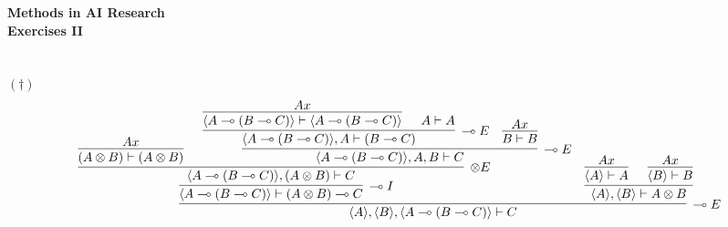 \documentclass[11pt]{article}
\newcommand{\nd}[2]{#1 \vdash #2}
\newcommand{\Zip}[1]{\langle #1 \rangle}
\newcommand{\lolli}{\multimap}
\begin{document}
\setlength{\unitlength}{1cm}

\begin{center}
{\bf Methods in AI Research} \\
\vskip5pt 
{\bf Exercises II} \\
\vskip5pt 
\end{center}

\section{}
\begin{scriptsize}
$(\dag)\qquad$ 
\[
\infer[\lolli E]{\nd{\Zip{A},\Zip{B},\Zip{A\lolli (B\lolli C)}}{C}}
{\infer[\lolli I]{\nd{\Zip{A\lolli (B\lolli C)}}{(A\otimes B)\lolli C}}
{\infer[\otimes E]{\nd{\Zip{A \lolli (B \lolli C)},(A \otimes B)}{C}}{{\infer[]{\nd{(A \otimes B)}{(A \otimes B)}}{Ax}} & 
{\infer[\lolli E]{\nd{\Zip{A \lolli (B \lolli C)},{A},{B}}{C}}{
{\infer[\lolli E]{\nd{\Zip{A \lolli (B \lolli C)},A}{(B \lolli C)}}
{
{\infer[]{\nd{\Zip{A\lolli(B \lolli C)}}{\Zip{A \lolli (B \lolli C)}}}{Ax}}&{\nd{A}{A}}
}}
&{\infer[]{\nd{B}{B}}{Ax}}}}}} &
\infer[]{\nd{\Zip{A},\Zip{B}}{A\otimes B}}
{{\infer[]{\nd{\Zip{A}}{A}}{Ax}} &
{\infer[]{\nd{\Zip{B}}{B}}{Ax}}}}
\]

\end{scriptsize}
\end{document}
